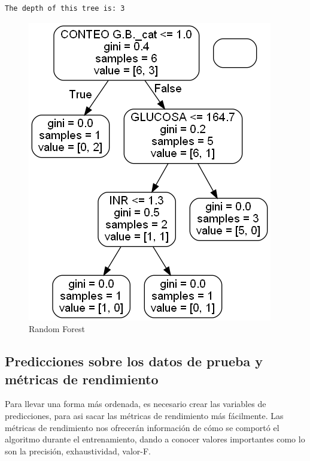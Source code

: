     \begin{Verbatim}[commandchars=\\\{\}]
The depth of this tree is: 3
    \end{Verbatim}
\begin{figure}
	\centering
	\includegraphics[scale=0.5]{Random Forest - Bosque Aleatorio/randomForestClassification.png} 
	\caption{Random Forest}
\end{figure}
    \hypertarget{predicciones-sobre-los-datos-de-prueba-y-muxe9tricas-de-rendimiento}{%
\subsection{Predicciones sobre los datos de prueba y métricas de
rendimiento}\label{predicciones-sobre-los-datos-de-prueba-y-muxe9tricas-de-rendimiento}}

Para llevar una forma más ordenada, es necesario crear las variables de
predicciones, para asi sacar las métricas de rendimiento más fácilmente.
Las métricas de rendimiento nos ofrecerán información de cómo se
comportó el algoritmo durante el entrenamiento, dando a conocer valores
importantes como lo son la precisión, exhaustividad, valor-F.

